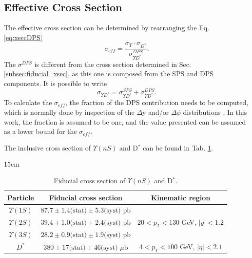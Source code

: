 \subsection{Effective Cross Section}

The effective cross section can be determined by rearranging the Eq. \ref{eq:xsecDPS}
\begin{equation}\label{eq:sigmaeff_YD}
  \sigma_{eff} = \frac{\sigma_\Upsilon \cdot \sigma_{D^*}}{\sigma_{\Upsilon D^*}^{DPS}}.
\end{equation}
The $\sigma^{DPS}$ is different from the cross section determined in Sec. \ref{subsec:fiducial_xsec}, as this one is composed from the SPS and DPS components. It is possible to write
\begin{equation}
  \sigma_{\Upsilon D^*} = \sigma_{\Upsilon D^*}^{SPS} + \sigma_{\Upsilon D^*}^{DPS}.
\end{equation}
To calculate the $\sigma_{eff}$, the fraction of the DPS contribution needs to be computed, which is normally done by inspection of the $\Delta$y and/or $\Delta\phi$ distributions \cite{Lansberg:2019adr}. In this work, the fraction is assumed to be one, and the value presented can be assumed as a lower bound for the $\sigma_{eff}$.

The inclusive cross section of $\Upsilon(nS)$ and D$^*$ can be found in Tab. \ref{tab:inclusive_xsec}.

\begin{table}[!htbp]{15cm}
  \caption{Fiducial cross section of $\Upsilon(nS)$ and D$^*$.}
  \begin{tabular}{ c | c | c }
    \hline
    Particle & Fiducial cross section & Kinematic region \\ \hline
    $\Upsilon(1S)$ & $87.7 \pm 1.4 \text{(stat)} \pm 5.3 \text{(syst)}$ pb  & \multirow[c]{3}{*}{$20 < p_T < 130$ GeV, $|y| < 1.2$} \bigstrut\\\cline{1-2}  
    $\Upsilon(2S)$ & $39.4 \pm 1.0 \text{(stat)} \pm 2.4 \text{(syst)}$ pb  &  \bigstrut\\\cline{1-2} 
    $\Upsilon(3S)$ & $28.2 \pm 0.9 \text{(stat)} \pm 1.9 \text{(syst)}$ pb  & \bigstrut\\\cline{1-3} 
    $D^*$          & $380 \pm 17 \text{(stat)} \pm 46 \text{(syst)}$ $\mu$b & $4 < p_T < 100$ GeV, $|\eta| < 2.1$ \\ \hline
  \end{tabular}
  \label{tab:inclusive_xsec}
\end{table}

